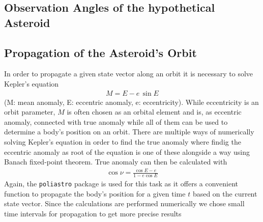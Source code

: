 \documentclass[11pt, a4paper]{article}
\numberwithin{equation}{section}
\begin{document}
\subsection{Observation Angles of the hypothetical Asteroid}

\subsection{Propagation of the Asteroid's Orbit}
In order to propagate  a given state vector along an orbit it is necessary to solve Kepler's equation
\begin{align}
	M = E - e\, \sin E
\end{align}
(M: mean anomaly, E: eccentric anomaly, e: eccentricity).
While eccentricity is an orbit parameter, $M$ is often chosen as an orbital element and is, as eccentric anomaly, connected with true anomaly while all of them can be used to determine a body's position on an orbit.
There are multiple ways of numerically solving Kepler's equation in order to find the true anomaly where findig the eccentric anomaly as root of the equation is one of these alongside a way using Banach fixed-point theorem.
True anomaly can then be calculated with
\begin{align}
\cos\nu = \frac{\cos E - e}{1 - e \cos E}
\end{align}
Again, the \texttt{poliastro} package is used for this task as it offers a convenient function to propagate the body's position for a given time $t$ based on the current state vector.
Since the calculations are performed numerically we chose small time intervals for propagation to get more precise results
\end{document}

